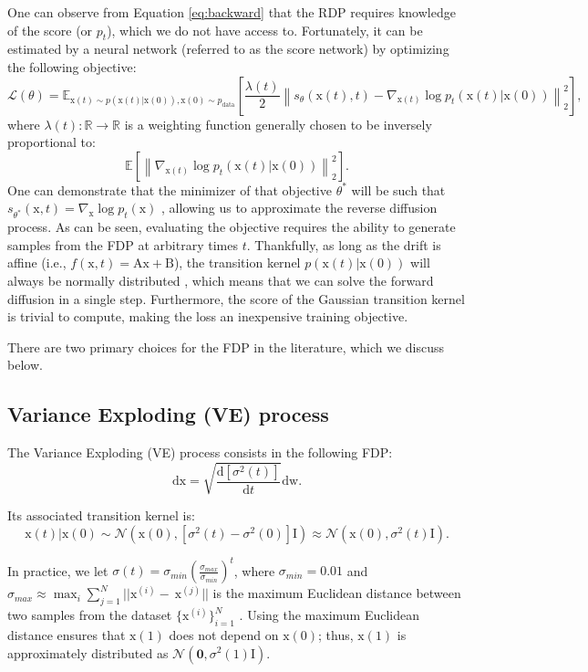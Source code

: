 \documentclass{article}
\newcommand{\norm}[1]{\left\lVert#1\right\rVert}
\newcommand{\Zero}{\boldsymbol{0}}
\newcommand{\I}{\boldsymbol{\mathrm{I}}}
\newcommand{\x}{\boldsymbol{\mathrm{x}}}
\newcommand{\A}{\boldsymbol{\mathrm{A}}}
\newcommand{\B}{\boldsymbol{\mathrm{B}}}
\newcommand{\w}{\boldsymbol{\mathrm{w}}}
\newcommand{\dr}{\mathrm{d}}
\begin{document}
One can observe from Equation \ref{eq:backward} that the RDP requires knowledge of the score (or $p_t$), which we do not have access to. Fortunately, it can be estimated by a neural network (referred to as the score network) by optimizing the following objective:
\begin{equation}\label{eqn:dsm}
\mathcal{L}(\theta) = \mathbb{E}_{ \x(t)\sim p(\x(t)|\x(0)), \x(0) \sim p_{\text{data}}}\left[ \frac{\lambda(t)}{2}\norm{s_{\theta}(\x(t),t) - \nabla_{\x(t)} \log p_t(\x(t)| \x(0)) }_2^2 \right],
\end{equation}
where $\lambda(t): \mathbb{R} \to \mathbb{R}$ is a weighting function generally chosen to be inversely proportional to: $$\mathbb{E} \left[ \norm{\nabla_{\x(t)} \log p_t(\x(t)| \x(0)) }_2^2 \right]. $$ One can demonstrate that the minimizer of that objective $\theta^*$ will be such that $s_{\theta^*}(\x,t) = \nabla_{\x} \log p_t(\x)$ \citep{vincent2011connection}, allowing us to approximate the reverse diffusion process. As can be seen, evaluating the objective requires the ability to generate samples from the FDP at arbitrary times $t$. Thankfully, as long as the drift is affine (i.e., $f(\x,t)=\A \x + \B$), the transition kernel $p(\x(t)|\x(0))$ will always be normally distributed \citep{sarkka2019applied}, which means that we can solve the forward diffusion in a single step. Furthermore, the score of the Gaussian transition kernel is trivial to compute, making the loss an inexpensive training objective. 

There are two primary choices for the FDP in the literature, which we discuss below.

\subsection{Variance Exploding (VE) process}

The Variance Exploding (VE) process consists in the following FDP:
\begin{equation*}
    \dr \x = \sqrt{\frac{\dr \left[\sigma^2(t) \right]}{\dr t}}\dr \w.
\end{equation*}

Its associated transition kernel is:
\begin{equation*}
    \x(t)|\x(0) \sim \mathcal{N}(\x(0), [\sigma^2(t) - \sigma^2(0)] \I ) \approx \mathcal{N}(\x(0), \sigma^2(t)\I ).
\end{equation*}

In practice, we let $\sigma(t) =\sigma_{min}\left(\frac{\sigma_{max}}{\sigma_{min}}\right)^t$, where $\sigma_{min} = 0.01$ and $\sigma_{max}
\approx \max_{i} \sum_{j=1}^N ||\x^{(i)} - \
\x^{(j)} ||$ is the maximum Euclidean distance between two samples from the dataset $\{\x^{(i)}\}_{i=1}^N$ \citep{song2020improved}. Using the maximum Euclidean distance ensures that $\x(1)$ does not depend on $\x(0)$; thus, $\x(1)$ is approximately distributed as $\mathcal{N}(\Zero, \sigma^2(1)\I)$.
\end{document}
